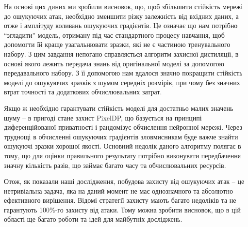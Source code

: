 \documentclass[14pt,a4paper]{extarticle}
\newcounter{e}
\numberwithin{equation}{section}
\numberwithin{figure}{section}
\begin{document}
 На основі цих диних ми зробили висновок, що, щоб збільшити стійкість мережі до ошукуючих атак, необхідно зменшити різку залежність від вхідних даних, а отже і амплітуду коливань ошукуючих градієнтів. Це означає що нам потрібно ``згладити'' модель, отриману під час стандартного процесу навчання, щоб допомогти їй краще узагальнювати зразки, які не є частиною тренувального набору. З цим завдання непогано справляється алгоритм захисної дистиляції, в основі якого лежить передача знань від оригінальної моделі за допомогою передавального набору. З її допомогою нам вдалося значно покращити стійкість моделі до ошукуючих зразків з шумом середніх розмірів, при чому без значних втрат точності та додаткових обчислювальних затрат.
 
 Якщо ж необхідно гарантувати стійкість моделі для достатньо малих значень шуму -- в пригоді стане захист PixelDP, що базується на принципі диференційованої приватності і рандомізує обчислення нейронної мережі. Через труднощі в обчисленні ошукуючих градієнтів зловмисникам буде важче знайти ошукуючі зразки хорошої якості. Основний недолік даного алгоритму полягає в тому, що для оцінки правильного результату потрібно виконувати передбачення значну кількість разів, що займає багато часу та обчислювальних ресурсів. 
 
 Отож, як показали наші дослідження, побудова захисту від ошукуючих атак -- це нетривіальна задача, яка на даний момент не має однозначного та абсолютно ефективного вирішення. Відомі стратегії захисту мають багато недоліків та не гарантують 100\%-го захисту від атаки. Тому можна зробити висновок, що в цій області ще багато роботи та ідей для майбутніх досліджень.
 
 
 
 
 
 
 \newpage
 \thispagestyle{empty}
\end{document}
